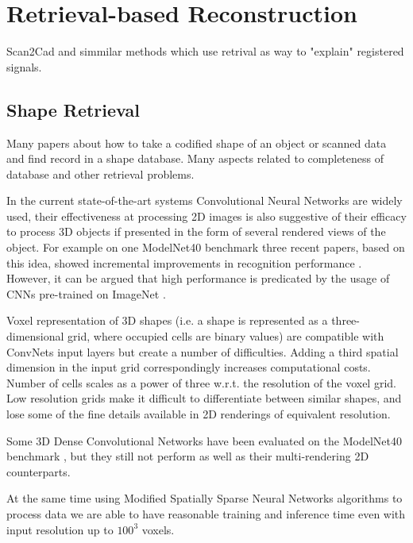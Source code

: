 \section{Retrieval-based Reconstruction}
\label{sec:retrieval_reconstruction}

Scan2Cad and simmilar methods which use retrival as way to "explain" registered signals.

\subsection{Shape Retrieval}
\label{sec:shape_retrieval}

Many papers about how to take a codified shape of an object or scanned data and find record in a shape database. Many aspects related to completeness of database and other retrieval problems.

In the current state-of-the-art systems Convolutional Neural Networks are widely used, their effectiveness at processing 2D images is also suggestive of their efficacy to process 3D objects if presented in the form of several rendered views of the object. For example on one ModelNet40 \cite{wu20153d} benchmark three recent papers, based on this idea, showed incremental improvements in recognition performance \cite{su15mvcnn,johns2016pairwise,hegde2016fusionnet}. However, it can be argued that high performance is predicated by the usage of CNNs pre-trained on ImageNet \cite{deng2009imagenet}.

Voxel representation of 3D shapes (i.e. a shape is represented as a three-dimensional grid, where occupied cells are binary values) are compatible with ConvNets input layers but create a number of difficulties.
Adding a third spatial dimension in the input grid correspondingly increases computational costs. Number of cells scales as a power of three w.r.t. the resolution of the voxel grid. Low resolution grids make it difficult to differentiate between similar shapes, and lose some of the fine details available in 2D renderings of equivalent resolution.

Some 3D Dense Convolutional Networks have been evaluated on the ModelNet40 benchmark \cite{maturana2015voxnet,sedaghat2016orientation,wu20153d,brock2016generative}, but they still not perform as well as their multi-rendering 2D counterparts.

At the same time using Modified Spatially Sparse Neural Networks algorithms \cite{graham2014spatially} to process data we are able to have reasonable training and inference time even with input resolution up to $100^3$ voxels.
